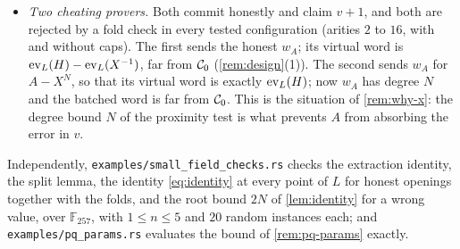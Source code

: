 \begin{itemize}
  \item \emph{Two cheating provers.} Both commit honestly and claim $v + 1$, and both are rejected by a fold check in every tested configuration (arities $2$ to $16$, with and without caps). The first sends the honest $w_A$; its virtual word is $\mathrm{ev}_L(H) - \mathrm{ev}_L(X^{-1})$, far from $\mathcal{C}_0$ (\cref{rem:design}(1)). The second sends $w_A$ for $A - X^N$, so that its virtual word is exactly $\mathrm{ev}_L(H)$; now $w_A$ has degree $N$ and the batched word is far from $\mathcal{C}_0$. This is the situation of \cref{rem:why-x}: the degree bound $N$ of the proximity test is what prevents $A$ from absorbing the error in $v$.
\end{itemize}
Independently, \texttt{examples/small\_field\_checks.rs} checks the extraction identity, the split lemma, the identity \eqref{eq:identity} at every point of $L$ for honest openings together with the folds, and the root bound $2N$ of \cref{lem:identity} for a wrong value, over $\mathbb{F}_{257}$, with $1 \le n \le 5$ and $20$ random instances each; and \texttt{examples/pq\_params.rs} evaluates the bound of \cref{rem:pq-params} exactly.

